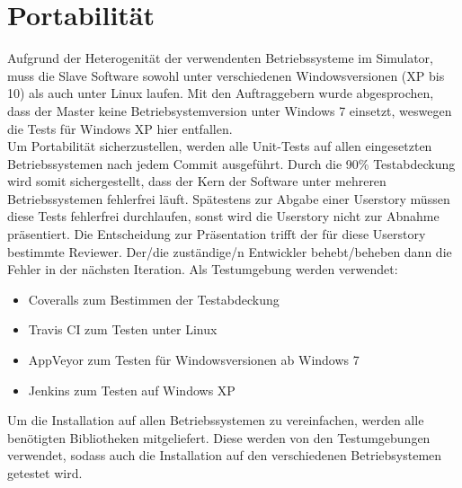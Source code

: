 \documentclass[accentcolor=tud9c,12pt,paper=a4]{tudreport}
\begin{document}
		\section{Portabilität}
		Aufgrund der Heterogenität der verwendenten Betriebssysteme im
		Simulator, muss die Slave Software sowohl unter verschiedenen Windowsversionen
		(XP bis 10) als auch unter Linux laufen.
		Mit den Auftraggebern wurde abgesprochen, dass der Master keine
		Betriebsystemversion unter Windows 7 einsetzt, weswegen die Tests für Windows
		XP hier entfallen.
		\\[5pt]
		Um Portabilität sicherzustellen, werden alle Unit-Tests auf allen eingesetzten
		Betriebssystemen nach jedem Commit ausgeführt. Durch die 90\% Testabdeckung
		wird somit sichergestellt, dass der Kern der Software unter mehreren Betriebssystemen
		fehlerfrei läuft. Spätestens zur Abgabe einer
		Userstory müssen diese Tests fehlerfrei durchlaufen, sonst wird die Userstory nicht
		zur Abnahme präsentiert. Die Entscheidung zur Präsentation trifft der für diese
		Userstory bestimmte Reviewer. Der/die zuständige/n Entwickler behebt/beheben dann die Fehler
		in der nächsten Iteration.
		Als Testumgebung werden verwendet:
		\begin{itemize}
			\item Coveralls zum Bestimmen der Testabdeckung
			\item Travis CI zum Testen unter Linux
			\item AppVeyor zum Testen für Windowsversionen ab Windows 7
			\item Jenkins zum Testen auf Windows XP
		\end{itemize}
		Um die Installation auf allen Betriebssystemen zu vereinfachen, werden alle benötigten
		Bibliotheken mitgeliefert. Diese werden von den Testumgebungen verwendet, sodass
		auch die Installation auf den verschiedenen Betriebsystemen getestet wird.
		\newpage
\end{document}
